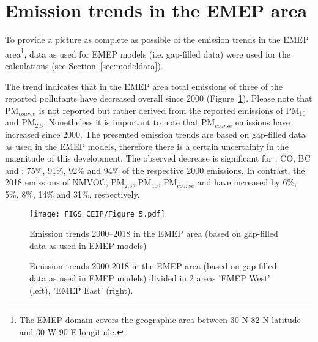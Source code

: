 \section{Emission trends in the EMEP area}
\label{sec:EmisTrend}

To provide a picture as complete as possible of the emission trends in the EMEP area\footnote{The EMEP domain covers the geographic area between 30{\degrees} N-82{\degrees} N latitude and 30{\degrees} 
  W-90{\degrees} E longitude.}, data as used for EMEP models (i.e. gap-filled data) were used for the calculations (see Section~\ref{sec:modeldata}).

The trend indicates that in the EMEP area total emissions of three of the reported pollutants have decreased overall since 2000 (Figure~\ref{fig:CEIP5}). Please note that PM$_{coarse}$ is not reported but rather derived from the reported emissions of PM$_{10}$ and PM$_{2.5}$. Nonetheless it is important to note that PM$_{coarse}$ emissions have increased since 2000.
The presented emission trends are based on gap-filled data as used in the EMEP models, therefore there is a certain uncertainty in the magnitude of this development. The observed decrease is significant for \sox, CO, BC and \nox; 75\%, 91\%, 92\% and 94\% of the respective 2000 emissions. In contrast, the 2018 emissions of NMVOC, PM$_{2.5}$, PM$_{10}$, PM$_{coarse}$ and \nhiii have increased by 6\%, 5\%, 8\%, 14\% and 31\%, respectively. 

\begin{figure}[h]
\centering
{\texttt{[image: FIGS\_CEIP/Figure\_5.pdf]}}
\caption{Emission trends 2000--2018 in the EMEP area (based on gap-filled data as used in EMEP models)}
\label{fig:CEIP5}
\end{figure}

\begin{figure}[h]
\centering
\caption{Emission trends 2000-2018 in the EMEP area (based on gap-filled data as used in EMEP models) divided in 2 areas 'EMEP West' (left), 'EMEP East' (right).}
\label{fig:CEIP6}
\end{figure}


